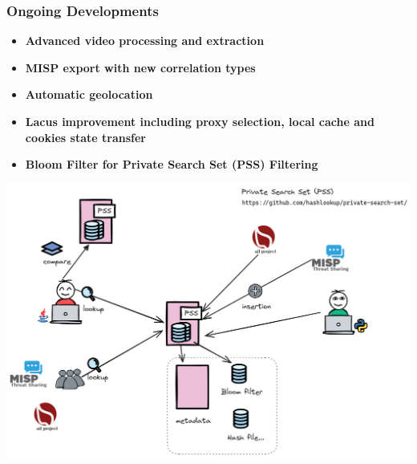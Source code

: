 \documentclass{beamer}
\begin{document}
\begin{frame}
    \frametitle{Ongoing Developments}
    \begin{itemize}
        \item \textbf{Advanced video processing and extraction}
        \item \textbf{MISP export with new correlation types}
        \item \textbf{Automatic geolocation}
	\item \textbf{Lacus improvement including proxy selection, local cache and cookies state transfer}
        \item \textbf{Bloom Filter for Private Search Set (PSS) Filtering}
    \end{itemize}
    \begin{center}
        \includegraphics[scale=0.18]{images/pss-overview.png}
    \end{center}
\end{frame}
\end{document}
